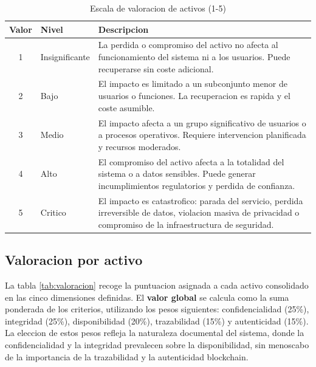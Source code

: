\documentclass[11pt, a4paper]{article}
\begin{document}
\begin{table}[H]
\centering
\renewcommand{\arraystretch}{1.4}
\small
\begin{tabular}{|c|l|p{9cm}|}
\hline
\textbf{Valor} & \textbf{Nivel} & \textbf{Descripcion} \\
\hline
1 & Insignificante & La perdida o compromiso del activo no afecta al funcionamiento del sistema ni a los usuarios. Puede recuperarse sin coste adicional. \\
\hline
2 & Bajo & El impacto es limitado a un subconjunto menor de usuarios o funciones. La recuperacion es rapida y el coste asumible. \\
\hline
3 & Medio & El impacto afecta a un grupo significativo de usuarios o a procesos operativos. Requiere intervencion planificada y recursos moderados. \\
\hline
4 & Alto & El compromiso del activo afecta a la totalidad del sistema o a datos sensibles. Puede generar incumplimientos regulatorios y perdida de confianza. \\
\hline
5 & Critico & El impacto es catastrofico: parada del servicio, perdida irreversible de datos, violacion masiva de privacidad o compromiso de la infraestructura de seguridad. \\
\hline
\end{tabular}
\caption{Escala de valoracion de activos (1-5)}
\label{tab:escala-valoracion}
\end{table}

\subsection{Valoracion por activo}

La tabla \ref{tab:valoracion} recoge la puntuacion asignada a cada activo consolidado en las cinco dimensiones definidas. El \textbf{valor global} se calcula como la suma ponderada de los criterios, utilizando los pesos siguientes: confidencialidad (25\%), integridad (25\%), disponibilidad (20\%), trazabilidad (15\%) y autenticidad (15\%). La eleccion de estos pesos refleja la naturaleza documental del sistema, donde la confidencialidad y la integridad prevalecen sobre la disponibilidad, sin menoscabo de la importancia de la trazabilidad y la autenticidad blockchain.
\end{document}
